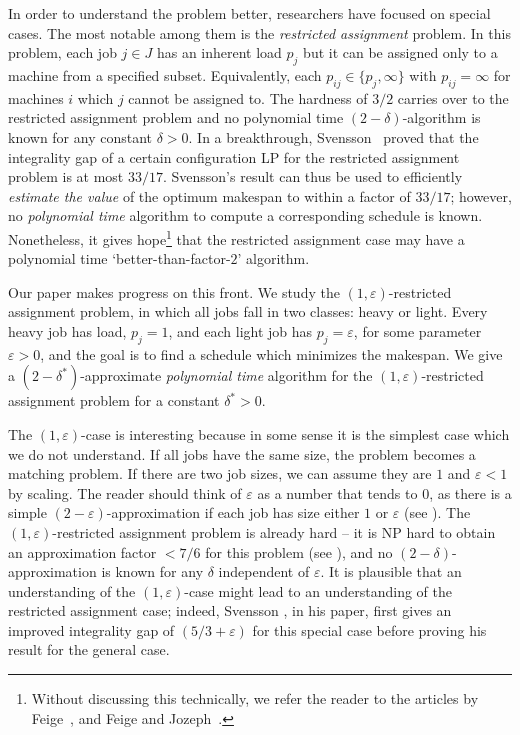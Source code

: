 \documentclass[11pt]{article}
\newcommand{\eps}{\varepsilon}
\renewcommand{\epsilon}{\varepsilon}
\renewcommand{\epsilon}{\varepsilon}
\begin{document}
In order to understand the problem better, researchers have focused on special cases. 
The most notable among them is the {\em restricted assignment} problem. In this problem, each job $j\in J$ has an inherent load $p_j$ but it can be assigned only to a machine  from a specified subset. Equivalently, each $p_{ij} \in \{p_j,\infty\}$ with $p_{ij} = \infty$ for machines $i$ which $j$ cannot be assigned to.
 The hardness of $3/2$ carries over to the restricted assignment problem and no  polynomial time $(2-\delta)$-algorithm is known for any constant $\delta > 0$.
In a breakthrough, Svensson~\cite{Sve11} proved that the integrality gap of a certain configuration LP for the restricted assignment problem is at most  $33/17$.  Svensson's result can thus be used to efficiently {\em estimate the value} of the optimum makespan to within a factor of $33/17$; however, no {\em polynomial time} algorithm to compute a corresponding schedule is known. Nonetheless, it gives hope\footnote{Without discussing this technically, we refer the reader to the articles by Feige~\cite{F08}, and Feige and Jozeph~\cite{FJ14}.} that the restricted assignment case may have a polynomial time `better-than-factor-$2$' algorithm. 

Our paper makes progress on this front.  We study the $(1,\epsilon)$-restricted assignment problem, in which 
all jobs fall in two classes: heavy or light. Every heavy job has load, $p_j = 1$, and each light job has $p_j = \eps$, for some parameter $\eps > 0$, and the goal is to find a schedule which minimizes the makespan.
We give a $(2-\delta^*)$-approximate \emph{polynomial time} algorithm for the $(1,\epsilon)$-restricted assignment problem for a constant $\delta^*\!>\! 0$.



The $(1,\epsilon)$-case is interesting because in some sense it is the simplest case which we do not understand. If all jobs have the same size, the problem becomes a matching problem. If there are two job sizes, we can assume they are $1$ and $\epsilon < 1$ by scaling. The reader should think of $\eps$ as a number that tends to $0$, as there is a simple $(2-\epsilon)$-approximation if each job has size either $1$ or $\eps$ (see ).  The $(1,\epsilon)$-restricted assignment problem is already hard -- it is NP hard to obtain an approximation factor $<7/6$ for this problem (see ), and no $(2-\delta)$-approximation is known for any $\delta$ independent of $\eps$.  It is plausible that an understanding of the $(1,\epsilon)$-case might lead to an understanding of  the restricted assignment case; indeed,
Svensson \cite{Sve11}, in his paper, first gives an improved integrality gap of $(5/3+\eps)$ for this special case before proving  his result for the general case. 
\end{document}
